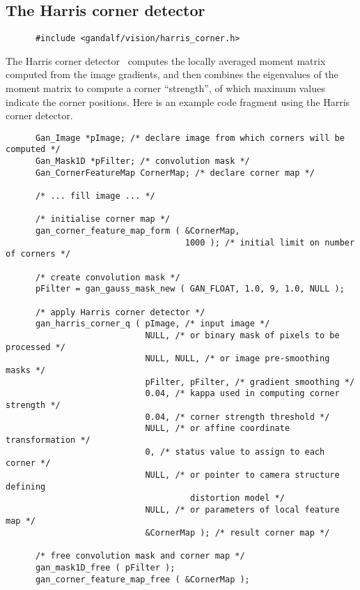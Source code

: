 \subsection{The Harris corner detector}
\begin{verbatim}
      #include <gandalf/vision/harris_corner.h>
\end{verbatim}
The Harris corner detector~\cite{Harris:Stephens:ALVEY88} computes the
locally averaged moment matrix computed from the image gradients, and
then combines the eigenvalues of the moment matrix to compute a corner
``strength'', of which maximum values indicate the corner positions.
Here is an example code fragment using the Harris corner detector.
\begin{verbatim}
      Gan_Image *pImage; /* declare image from which corners will be computed */
      Gan_Mask1D *pFilter; /* convolution mask */
      Gan_CornerFeatureMap CornerMap; /* declare corner map */

      /* ... fill image ... */

      /* initialise corner map */
      gan_corner_feature_map_form ( &CornerMap,
                                    1000 ); /* initial limit on number of corners */

      /* create convolution mask */
      pFilter = gan_gauss_mask_new ( GAN_FLOAT, 1.0, 9, 1.0, NULL );
      
      /* apply Harris corner detector */
      gan_harris_corner_q ( pImage, /* input image */
                            NULL, /* or binary mask of pixels to be processed */
                            NULL, NULL, /* or image pre-smoothing masks */
                            pFilter, pFilter, /* gradient smoothing */
                            0.04, /* kappa used in computing corner strength */
                            0.04, /* corner strength threshold */
                            NULL, /* or affine coordinate transformation */
                            0, /* status value to assign to each corner */
                            NULL, /* or pointer to camera structure defining
                                     distortion model */
                            NULL, /* or parameters of local feature map */
                            &CornerMap ); /* result corner map */

      /* free convolution mask and corner map */
      gan_mask1D_free ( pFilter );
      gan_corner_feature_map_free ( &CornerMap );
\end{verbatim}

